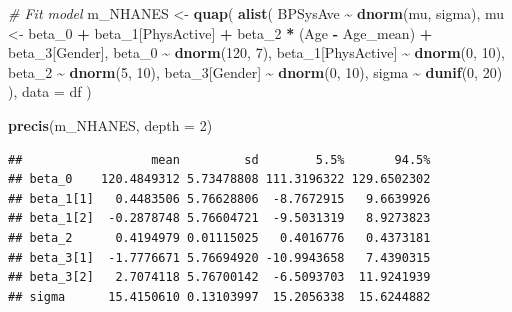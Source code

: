 \documentclass[
]{book}
\newenvironment{Shaded}{\begin{snugshade}}{\end{snugshade}}
\newcommand{\AttributeTok}[1]{\textcolor[rgb]{0.13,0.29,0.53}{#1}}
\newcommand{\CommentTok}[1]{\textcolor[rgb]{0.56,0.35,0.01}{\textit{#1}}}
\newcommand{\DecValTok}[1]{\textcolor[rgb]{0.00,0.00,0.81}{#1}}
\newcommand{\FunctionTok}[1]{\textcolor[rgb]{0.13,0.29,0.53}{\textbf{#1}}}
\newcommand{\NormalTok}[1]{#1}
\newcommand{\OtherTok}[1]{\textcolor[rgb]{0.56,0.35,0.01}{#1}}
\newcommand{\SpecialCharTok}[1]{\textcolor[rgb]{0.81,0.36,0.00}{\textbf{#1}}}
\begin{document}
\begin{Shaded}
\begin{Highlighting}[]
\CommentTok{\# Fit model}
\NormalTok{m\_NHANES }\OtherTok{\textless{}{-}} \FunctionTok{quap}\NormalTok{(}
  \FunctionTok{alist}\NormalTok{(}
\NormalTok{    BPSysAve }\SpecialCharTok{\textasciitilde{}} \FunctionTok{dnorm}\NormalTok{(mu, sigma), }
\NormalTok{    mu }\OtherTok{\textless{}{-}}\NormalTok{ beta\_0 }\SpecialCharTok{+}\NormalTok{ beta\_1[PhysActive] }\SpecialCharTok{+}\NormalTok{ beta\_2 }\SpecialCharTok{*}\NormalTok{ (Age }\SpecialCharTok{{-}}\NormalTok{ Age\_mean) }\SpecialCharTok{+}\NormalTok{ beta\_3[Gender],}
\NormalTok{    beta\_0 }\SpecialCharTok{\textasciitilde{}} \FunctionTok{dnorm}\NormalTok{(}\DecValTok{120}\NormalTok{, }\DecValTok{7}\NormalTok{),}
\NormalTok{    beta\_1[PhysActive] }\SpecialCharTok{\textasciitilde{}} \FunctionTok{dnorm}\NormalTok{(}\DecValTok{0}\NormalTok{, }\DecValTok{10}\NormalTok{),  }
\NormalTok{    beta\_2 }\SpecialCharTok{\textasciitilde{}} \FunctionTok{dnorm}\NormalTok{(}\DecValTok{5}\NormalTok{, }\DecValTok{10}\NormalTok{),}
\NormalTok{    beta\_3[Gender] }\SpecialCharTok{\textasciitilde{}} \FunctionTok{dnorm}\NormalTok{(}\DecValTok{0}\NormalTok{, }\DecValTok{10}\NormalTok{),  }
\NormalTok{    sigma }\SpecialCharTok{\textasciitilde{}} \FunctionTok{dunif}\NormalTok{(}\DecValTok{0}\NormalTok{, }\DecValTok{20}\NormalTok{) }
\NormalTok{  ),}
  \AttributeTok{data =}\NormalTok{ df}
\NormalTok{)}

\FunctionTok{precis}\NormalTok{(m\_NHANES, }\AttributeTok{depth =} \DecValTok{2}\NormalTok{)}
\end{Highlighting}
\end{Shaded}

\begin{verbatim}
##                  mean         sd        5.5%       94.5%
## beta_0    120.4849312 5.73478808 111.3196322 129.6502302
## beta_1[1]   0.4483506 5.76628806  -8.7672915   9.6639926
## beta_1[2]  -0.2878748 5.76604721  -9.5031319   8.9273823
## beta_2      0.4194979 0.01115025   0.4016776   0.4373181
## beta_3[1]  -1.7776671 5.76694920 -10.9943658   7.4390315
## beta_3[2]   2.7074118 5.76700142  -6.5093703  11.9241939
## sigma      15.4150610 0.13103997  15.2056338  15.6244882
\end{verbatim}
\end{document}

